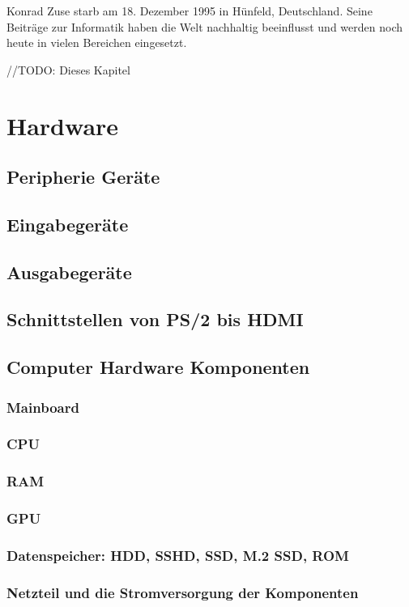 \documentclass[12pt]{article}
\begin{document}
Konrad Zuse starb am 18. Dezember 1995 in Hünfeld, Deutschland. Seine Beiträge zur Informatik haben die Welt nachhaltig beeinflusst und werden noch heute in vielen Bereichen eingesetzt.

//TODO: Dieses Kapitel


\section{Hardware}
\subsection{Peripherie Geräte}
\subsection{Eingabegeräte}
\subsection{Ausgabegeräte}
\subsection{Schnittstellen von PS/2 bis HDMI}
\subsection{Computer Hardware Komponenten}
\subsubsection{Mainboard}
\subsubsection{CPU}
\subsubsection{RAM}
\subsubsection{GPU}
\subsubsection{Datenspeicher: HDD, SSHD, SSD, M.2 SSD, ROM}
\subsubsection{Netzteil und die Stromversorgung der Komponenten}
\end{document}
